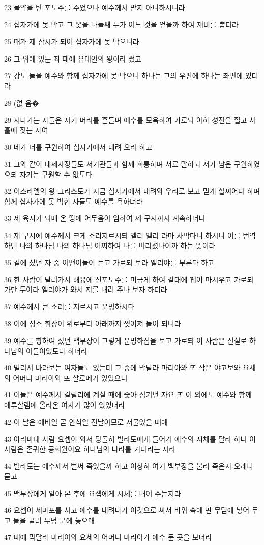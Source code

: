 \par 23 몰약을 탄 포도주를 주었으나 예수께서 받지 아니하시니라
\par 24 십자가에 못 박고 그 옷을 나눌쌔 누가 어느 것을 얻을까 하여 제비를 뽑더라
\par 25 때가 제 삼시가 되어 십자가에 못 박으니라
\par 26 그 위에 있는 죄 패에 유대인의 왕이라 썼고
\par 27 강도 둘을 예수와 함께 십자가에 못 박으니 하나는 그의 우편에 하나는 좌편에 있더라
\par 28 (없 음�
\par 29 지나가는 자들은 자기 머리를 흔들며 예수를 모욕하여 가로되 아하 성전을 헐고 사흘에 짓는 자여
\par 30 네가 너를 구원하여 십자가에서 내려 오라 하고
\par 31 그와 같이 대제사장들도 서기관들과 함께 희롱하며 서로 말하되 저가 남은 구원하였으되 자기는 구원할 수 없도다
\par 32 이스라엘의 왕 그리스도가 지금 십자가에서 내려와 우리로 보고 믿게 할찌어다 하며 함께 십자가에 못 박힌 자들도 예수를 욕하더라
\par 33 제 육시가 되매 온 땅에 어두움이 임하여 제 구시까지 계속하더니
\par 34 제 구시에 예수께서 크게 소리지르시되 엘리 엘리 라마 사박다니 하시니 이를 번역하면 나의 하나님 나의 하나님 어찌하여 나를 버리셨나이까 하는 뜻이라
\par 35 곁에 섰던 자 중 어떤이들이 듣고 가로되 보라 엘리야를 부른다 하고
\par 36 한 사람이 달려가서 해융에 신포도주를 머금게 하여 갈대에 꿰어 마시우고 가로되 가만 두어라 엘리야가 와서 저를 내려 주나 보자 하더라
\par 37 예수께서 큰 소리를 지르시고 운명하시다
\par 38 이에 성소 휘장이 위로부터 아래까지 찢어져 둘이 되니라
\par 39 예수를 향하여 섰던 백부장이 그렇게 운명하심을 보고 가로되 이 사람은 진실로 하나님의 아들이었도다 하더라
\par 40 멀리서 바라보는 여자들도 있는데 그 중에 막달라 마리아와 또 작은 야고보와 요세의 어머니 마리아와 또 살로메가 있었으니
\par 41 이들은 예수께서 갈릴리에 계실 때에 좇아 섬기던 자요 또 이 외에도 예수와 함께 예루살렘에 올라온 여자가 많이 있었더라
\par 42 이 날은 예비일 곧 안식일 전날이므로 저물었을 때에
\par 43 아리마대 사람 요셉이 와서 당돌히 빌라도에게 들어가 예수의 시체를 달라 하니 이 사람은 존귀한 공회원이요 하나님의 나라를 기다리는 자라
\par 44 빌라도는 예수께서 벌써 죽었을까 하고 이상히 여겨 백부장을 불러 죽은지 오래냐 묻고
\par 45 백부장에게 알아 본 후에 요셉에게 시체를 내어 주는지라
\par 46 요셉이 세마포를 사고 예수를 내려다가 이것으로 싸서 바위 속에 판 무덤에 넣어 두고 돌을 굴려 무덤 문에 놓으매
\par 47 때에 막달라 마리아와 요세의 어머니 마리아가 예수 둔 곳을 보더라


